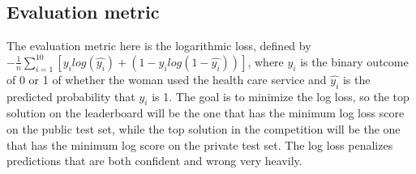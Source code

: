 \documentclass{article}\usepackage[]{graphicx}\usepackage[]{color}
\begin{document}
                                                                                                                                                                                                                                                                                                                                                                                                                                                                                                                                                                                                \subsection{Evaluation metric}
                                                                                                                                                                                                                                                                                                                                                                                                                                                                                                                                                                                                The evaluation metric here is the logarithmic loss, defined by $-\frac{1}{n}\sum_{i=1}^{10} [y_i log(\hat{y_i}) + (1-y_i log(1-\hat{y_i}))]$, where $y_i$ is the binary outcome of 0 or 1 of whether the woman used the health care service and $\hat{y_i}$ is the predicted probability that $y_i$ is 1. The goal is to minimize the log loss, so the top solution on the leaderboard will be the one that has the minimum log loss score on the public test set, while the top solution in the competition will be the one that has the minimum log score on the private test set. The log loss penalizes predictions that are both confident and wrong very heavily.
                                                                                                                                                                                                                                                                                                                                                                                                                                                                                                                                                                                                
\end{document}
